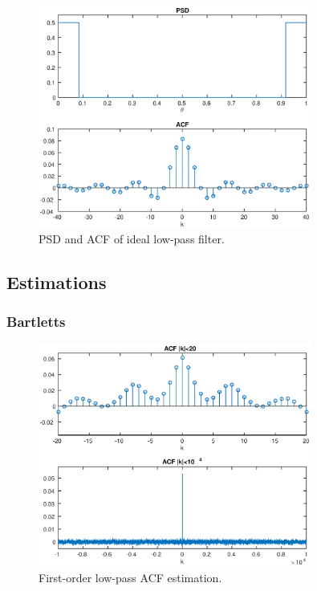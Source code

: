 \begin{figure}[h]
\centering
\includegraphics[width=0.8\textwidth]{bilder/Lab1/Lab1fig2.eps}
\caption{PSD and ACF of ideal low-pass filter.}
\label{fig:Lab1fig2}
\end{figure}


\subsection{Estimations}


\subsubsection{Bartletts}

\begin{figure}[h]
\centering
\includegraphics[width=0.8\textwidth]{bilder/Lab1/Lab1fig3.eps}
\caption{First-order low-pass ACF estimation.}
\label{fig:Lab1fig3}
\end{figure}

